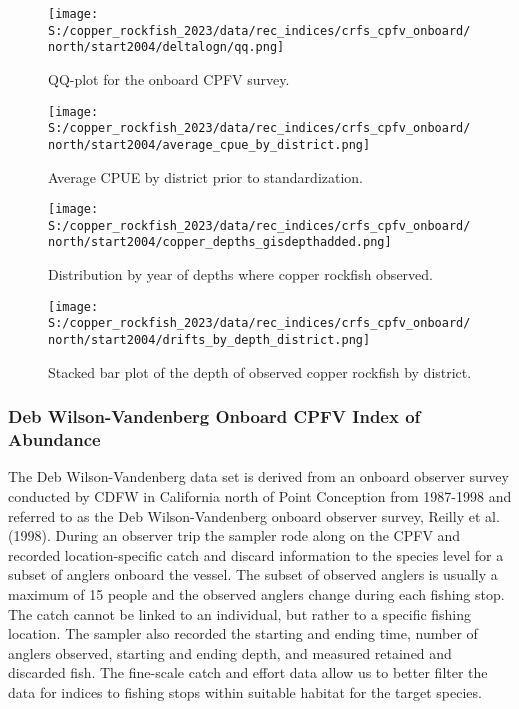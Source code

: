 \documentclass[11pt,
  english,
  letterpaper,
]{article}
\begin{document}
\newpage

\begin{figure}
\centering
\texttt{[image: S:/copper\_rockfish\_2023/data/rec\_indices/crfs\_cpfv\_onboard/north/start2004/deltalogn/qq.png]}
\caption{QQ-plot for the onboard CPFV survey.\label{fig:onboard-qq}}
\end{figure}

\newpage

\begin{figure}
\centering
\texttt{[image: S:/copper\_rockfish\_2023/data/rec\_indices/crfs\_cpfv\_onboard/north/start2004/average\_cpue\_by\_district.png]}
\caption{Average CPUE by district prior to standardization.\label{fig:onboard-regioncpue}}
\end{figure}

\newpage

\begin{figure}
\centering
\texttt{[image: S:/copper\_rockfish\_2023/data/rec\_indices/crfs\_cpfv\_onboard/north/start2004/copper\_depths\_gisdepthadded.png]}
\caption{Distribution by year of depths where copper rockfish observed.\label{fig:onboard-depths}}
\end{figure}

\newpage

\begin{figure}
\centering
\texttt{[image: S:/copper\_rockfish\_2023/data/rec\_indices/crfs\_cpfv\_onboard/north/start2004/drifts\_by\_depth\_district.png]}
\caption{Stacked bar plot of the depth of observed copper rockfish by district.\label{fig:onboard-depths}}
\end{figure}

\newpage

\hypertarget{dwv-cpfv-index}{%
\subsubsection{Deb Wilson-Vandenberg Onboard CPFV Index of Abundance}\label{dwv-cpfv-index}}

The Deb Wilson-Vandenberg data set is derived from an onboard observer survey conducted by CDFW in California north of Point Conception from 1987-1998 and referred to as the Deb Wilson-Vandenberg onboard observer survey, Reilly et al. (1998). During an observer trip the sampler rode along on the CPFV and recorded location-specific catch and discard information to the species level for a subset of anglers onboard the vessel. The subset of observed anglers is usually a maximum of 15 people and the observed anglers change during each fishing stop. The catch cannot be linked to an individual, but rather to a specific fishing location. The sampler also recorded the starting and ending time, number of anglers observed, starting and ending depth, and measured retained and discarded fish. The fine-scale catch and effort data allow us to better filter the data for indices to fishing stops within suitable habitat for the target species.
\end{document}
